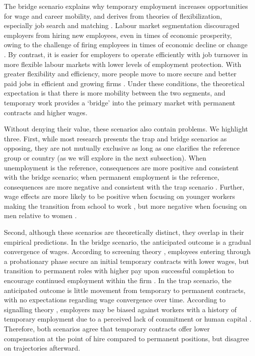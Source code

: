 \documentclass[12pt]{article}
\begin{document}
The bridge scenario explains why temporary employment increases opportunities for wage and career mobility, and derives from theories of flexibilization, especially job search \citep{lippman_economics_1976} and matching \citep{sorensen_outline_2018}.  Labour market segmentation discouraged employers from hiring new employees, even in times of economic prosperity, owing to the challenge of firing employees in times of economic decline or change \citep{lazear_1990}.  By contrast, it is easier for employers to operate efficiently with job turnover in more flexible labour markets with lower levels of employment protection.  With greater flexibility and efficiency, more people move to more secure and better paid jobs in efficient and growing firms \citep{kalleberg_2001}.  Under these conditions, the theoretical expectation is that there is more mobility between the two segments, and temporary work provides a `bridge' into the primary market with permanent contracts and higher wages.  

Without denying their value, these scenarios also contain problems.  We highlight three.  First, while most research presents the trap and bridge scenarios as opposing, they are not mutually exclusive as long as one clarifies the reference group or country (as we will explore in the next subsection).  When unemployment is the reference, consequences are more positive and consistent with the bridge scenario; when permanent employment is the reference, consequences are more negative and consistent with the trap scenario  \citep{fuller_up_2011}.  Further, wage effects are more likely to be positive when focusing on younger workers making the transition from school to work \citep{gebel_is_2013,pavlopoulos_starting_2013}, but more negative when focusing on men relative to women \citep{booth_temporary_2002,mooi-reci_casual_2017}.  

Second, although these scenarios are theoretically distinct, they overlap in their empirical predictions.  In the bridge scenario, the anticipated outcome is a gradual convergence of wages. According to screening theory \citep{stiglitz_theory_1975}, employees entering through a probationary phase secure an initial temporary contracts with lower wages, but transition to permanent roles with higher pay upon successful completion to encourage continued employment within the firm \citep{wang_weiss_1998}.  In the trap scenario, the anticipated outcome is little movement from temporary to permanent contracts, with no expectations regarding wage convergence over time. According to signalling theory \citep{spence_job_1973}, employers may be biased against workers with a history of temporary employment due to a perceived lack of commitment or human capital \citep{mooi-reci_fixed-term_2015}.  Therefore, both scenarios agree that temporary contracts offer lower compensation at the point of hire compared to permanent positions, but disagree on trajectories afterward. 
\end{document}
